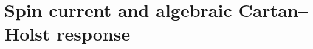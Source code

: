 %

\section{Spin current and algebraic Cartan--Holst response}
\label{vii:vii:sec:corriente-respuesta-cartan}

